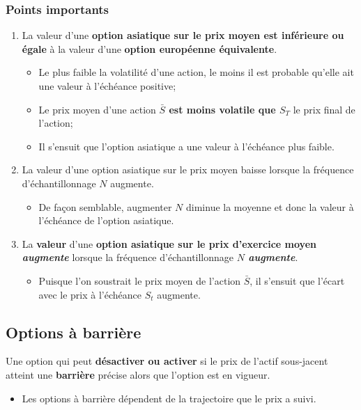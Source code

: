 \documentclass[10pt, french]{article}
\begin{document}
\begin{multicols*}{2}
\subsubsection*{Points importants}
\begin{enumerate}
	\item	La valeur d'une \textbf{option asiatique sur le prix moyen est inférieure ou égale} à la valeur d'une \textbf{option européenne équivalente}.
		\begin{itemize}
		\item	Le plus faible la volatilité d'une action, le moins il est probable qu'elle ait une valeur à l'échéance positive;
		\item	Le prix moyen d'une action \textbf{$\bar{S}$ est moins volatile que $S_{T}$} le prix final de l'action;
		\item	Il s'ensuit que l'option asiatique a une valeur à l'échéance plus faible.
		\end{itemize}
	\item	La valeur d'une option asiatique sur le prix moyen baisse lorsque la fréquence d'échantillonnage $N$ augmente.
		\begin{itemize}
		\item	De façon semblable, augmenter $N$ diminue la moyenne et donc la valeur à l'échéance de l'option asiatique.
		\end{itemize}
	\item	La \textbf{valeur} d'une \textbf{option asiatique sur le prix d'exercice moyen} \textit{\textbf{augmente}} lorsque la fréquence d'échantillonnage \textbf{$N$ \textit{augmente}}.
		\begin{itemize}
		\item	Puisque l'on soustrait le prix moyen de l'action $\bar{S}$, il s'ensuit que l'écart avec le prix à l'échéance $S_{t}$ augmente.
		\end{itemize}
\end{enumerate}

\columnbreak
\subsection{Options à barrière}
\begin{definitionNOHFILL}
Une option qui peut \textbf{désactiver ou activer} si le prix de l'actif sous-jacent atteint une \textbf{barrière} précise alors que l'option est en vigueur.

\tcbline

\begin{itemize}[leftmargin = *]
	\item	Les options à barrière dépendent de la trajectoire que le prix a suivi.
\end{itemize}
\end{definitionNOHFILL}


\end{multicols*}
\end{document}
